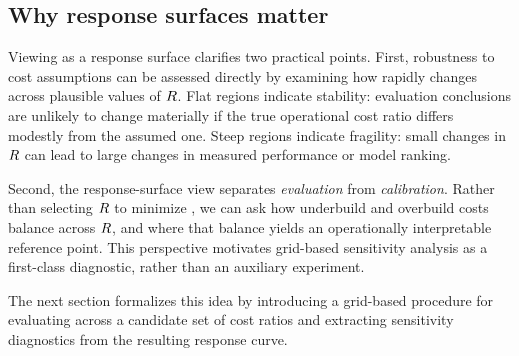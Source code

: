 \subsection{Why response surfaces matter}
\label{subsec:why_surface}

Viewing \CWSL{} as a response surface clarifies two practical points.
First, robustness to cost assumptions can be assessed directly by examining how
rapidly \CWSLR{} changes across plausible values of $R$.
Flat regions indicate stability: evaluation conclusions are unlikely to change
materially if the true operational cost ratio differs modestly from the assumed
one.
Steep regions indicate fragility: small changes in $R$ can lead to large changes
in measured performance or model ranking.

Second, the response-surface view separates \emph{evaluation} from
\emph{calibration}.
Rather than selecting $R$ to minimize \CWSL{}, we can ask how underbuild and
overbuild costs balance across $R$, and where that balance yields an
operationally interpretable reference point.
This perspective motivates grid-based sensitivity analysis as a first-class
diagnostic, rather than an auxiliary experiment.

The next section formalizes this idea by introducing a grid-based procedure for
evaluating \CWSL{} across a candidate set of cost ratios and extracting
sensitivity diagnostics from the resulting response curve.
